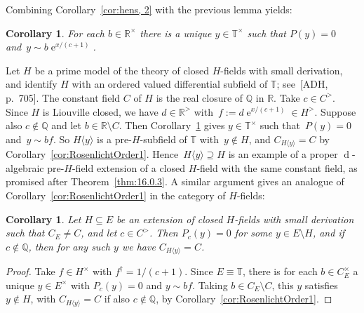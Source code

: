 \documentclass[]{amsart}
\numberwithin{equation}{section}
\newcommand{\bbold}{\mathbb}
\def\R { {\bbold R} }
\def\Q { {\bbold Q} }
\def\T { {\bbold T} }
\def \ex{\operatorname{e}}
\def \d{\operatorname{d}}
\newtheorem{cor}[theorem]{Corollary}
\theoremstyle{definition}
\theoremstyle{remark}
\begin{document}
\noindent
Combining Corollary~\ref{cor:hens, 2} with the previous lemma yields:

\begin{cor}\label{cor:zeros of P}
For each $b\in\R^\times$ there is a unique $y\in\T^\times$ such that $P(y)=0$ and~$y\sim b\ex^{x/(c+1)}$.
\end{cor}
 
\noindent
Let $H$ be a prime model of the theory of closed $H$-fields with small derivation, and identify $H$ with an ordered valued differential subfield of
$\T$; see~[ADH, p.~705]. The constant field $C$ of $H$ is the real closure of $\Q$ in $\R$. 
Take $c\in C^>$. Since $H$ is Liouville closed,   we have $d\in\R^>$ with~$f:=d\ex^{x/(c+1)}\in  H^>$.
Suppose also $c\notin\Q$ and 
let $b\in\R\setminus C$. Then Corollary~\ref{cor:zeros of P} gives $y\in\T^\times$ such that~${P(y)=0}$ and~$y\sim bf$.
So $H\langle y\rangle$  is a pre-$H$-subfield of $\T$ with~$y\notin H$, and  $C_{H\langle y\rangle}=C$ by Corollary~\ref{cor:RosenlichtOrder1}.
Hence~$H\langle y\rangle\supseteq H$ is an example of a proper $\d$-algebraic pre-$H$-field extension of a closed $H$-field with the same constant field, as promised after Theorem~\ref{thm:16.0.3}.
A similar argument gives an analogue of Corollary~\ref{cor:RosenlichtOrder1} in the category of $H$-fields:
 
\begin{cor}\label{cor:RosenlichtOrder1, H-fields}
Let $H\subseteq E$ be an extension of closed $H$-fields with small derivation such that $C_E\neq C$, and let $c\in C^>$. Then $P_c(y)=0$ for some $y\in E\setminus H$, and if~$c\notin\Q$, then for any such $y$ we have $C_{H\langle y\rangle}=C$.
\end{cor}
\begin{proof}
Take $f\in H^\times$ with $f^\dagger=1/(c+1)$. Since $E\equiv\mathbb T$, there is for each $b\in C_E^\times$ a unique $y\in E^\times$ with $P_c(y)=0$ and $y\sim bf$.
Taking $b\in C_E\setminus C$, this $y$ satisfies~$y\notin H$, with $C_{H\langle y\rangle}=C$ if also $c\notin \Q$, by Corollary~\ref{cor:RosenlichtOrder1}.
\end{proof}
\end{document}
